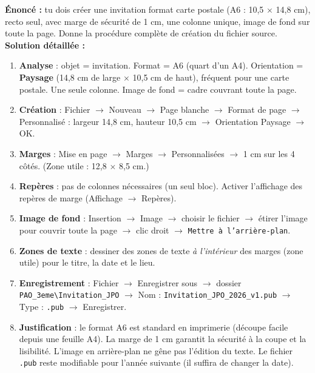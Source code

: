 \documentclass[11pt]{article}
\begin{document}
\begin{exoresolu}
\textbf{Énoncé :} tu dois créer une invitation format carte postale (A6 : 10,5 $\times$ 14,8 cm), recto seul, avec marge de sécurité de 1 cm, une colonne unique, image de fond sur toute la page. Donne la procédure complète de création du fichier source.
\tcblower
\textbf{Solution détaillée :}
\begin{enumerate}
    \item \textbf{Analyse} : objet = invitation. Format = A6 (quart d'un A4). Orientation = \textbf{Paysage} (14,8 cm de large $\times$ 10,5 cm de haut), fréquent pour une carte postale. Une seule colonne. Image de fond = cadre couvrant toute la page.
    \item \textbf{Création} : Fichier $\rightarrow$ Nouveau $\rightarrow$ Page blanche $\rightarrow$ Format de page $\rightarrow$ Personnalisé : largeur 14,8 cm, hauteur 10,5 cm $\rightarrow$ Orientation Paysage $\rightarrow$ OK.
    \item \textbf{Marges} : Mise en page $\rightarrow$ Marges $\rightarrow$ Personnalisées $\rightarrow$ 1 cm sur les 4 côtés. (Zone utile : 12,8 $\times$ 8,5 cm.)
    \item \textbf{Repères} : pas de colonnes nécessaires (un seul bloc). Activer l'affichage des repères de marge (Affichage $\rightarrow$ Repères).
    \item \textbf{Image de fond} : Insertion $\rightarrow$ Image $\rightarrow$ choisir le fichier $\rightarrow$ étirer l'image pour couvrir toute la page $\rightarrow$ clic droit $\rightarrow$ \texttt{Mettre à l'arrière-plan}.
    \item \textbf{Zones de texte} : dessiner des zones de texte \emph{à l'intérieur} des marges (zone utile) pour le titre, la date et le lieu.
    \item \textbf{Enregistrement} : Fichier $\rightarrow$ Enregistrer sous $\rightarrow$ dossier \texttt{PAO\_3eme\textbackslash Invitation\_JPO} $\rightarrow$ Nom : \texttt{Invitation\_JPO\_2026\_v1.pub} $\rightarrow$ Type : \texttt{.pub} $\rightarrow$ Enregistrer.
    \item \textbf{Justification} : le format A6 est standard en imprimerie (découpe facile depuis une feuille A4). La marge de 1 cm garantit la sécurité à la coupe et la lisibilité. L'image en arrière-plan ne gêne pas l'édition du texte. Le fichier \texttt{.pub} reste modifiable pour l'année suivante (il suffira de changer la date).
\end{enumerate}
\end{exoresolu}
\end{document}
